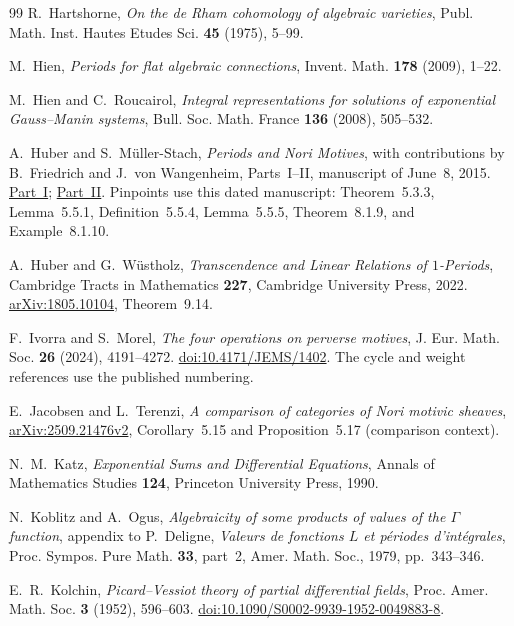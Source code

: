 \documentclass[11pt]{article}
\numberwithin{equation}{section}
\theoremstyle{definition}
\theoremstyle{remark}
\begin{document}
\begin{thebibliography}{99}
R.~Hartshorne,
\emph{On the de Rham cohomology of algebraic varieties},
Publ. Math. Inst. Hautes Etudes Sci. \textbf{45} (1975), 5--99.

M.~Hien, \emph{Periods for flat algebraic connections},
Invent. Math. \textbf{178} (2009), 1--22.

M.~Hien and C.~Roucairol,
\emph{Integral representations for solutions of exponential Gauss--Manin systems},
Bull. Soc. Math. France \textbf{136} (2008), 505--532.

A.~Huber and S.~M\"uller-Stach, \emph{Periods and Nori Motives},
with contributions by B.~Friedrich and J.~von Wangenheim,
Parts~I--II, manuscript of June~8, 2015.
\href{https://home.mathematik.uni-freiburg.de/arithgeom/preprints/buch-alt/partI.pdf}{Part~I};
\href{https://home.mathematik.uni-freiburg.de/arithgeom/preprints/buch-alt/partII.pdf}{Part~II}.
Pinpoints use this dated manuscript: Theorem~5.3.3, Lemma~5.5.1,
Definition~5.5.4, Lemma~5.5.5, Theorem~8.1.9, and Example~8.1.10.

A.~Huber and G.~W\"ustholz, \emph{Transcendence and Linear Relations of
$1$-Periods}, Cambridge Tracts in Mathematics \textbf{227}, Cambridge
University Press, 2022. \href{https://arxiv.org/abs/1805.10104}{arXiv:1805.10104},
Theorem~9.14.

F.~Ivorra and S.~Morel, \emph{The four operations on perverse motives},
J. Eur. Math. Soc. \textbf{26} (2024), 4191--4272.
\href{https://doi.org/10.4171/JEMS/1402}{doi:10.4171/JEMS/1402}.
The cycle and weight references use the published numbering.

E.~Jacobsen and L.~Terenzi, \emph{A comparison of categories of Nori
motivic sheaves}, \href{https://arxiv.org/abs/2509.21476v2}{arXiv:2509.21476v2},
Corollary~5.15 and Proposition~5.17 (comparison context).

N.~M.~Katz,
\emph{Exponential Sums and Differential Equations},
Annals of Mathematics Studies \textbf{124}, Princeton University Press, 1990.

N.~Koblitz and A.~Ogus,
\emph{Algebraicity of some products of values of the $\Gamma$ function},
appendix to P.~Deligne, \emph{Valeurs de fonctions $L$ et p\'eriodes d'int\'egrales},
Proc. Sympos. Pure Math. \textbf{33}, part~2, Amer. Math. Soc., 1979,
pp.~343--346.

E.~R.~Kolchin, \emph{Picard--Vessiot theory of partial differential fields},
Proc. Amer. Math. Soc. \textbf{3} (1952), 596--603.
\href{https://doi.org/10.1090/S0002-9939-1952-0049883-8}{doi:10.1090/S0002-9939-1952-0049883-8}.


\end{thebibliography}
\end{document}
